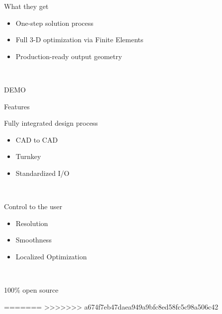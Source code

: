 \begin{frame}{What they get}	
\begin{itemize}
			\item One-step solution process	
			\item Full 3-D optimization via Finite Elements
			\item Production-ready output geometry
			\end{itemize}~\\
\end{frame}	

\begin{frame}{DEMO}

\end{frame}

\begin{frame}{Features}

\begin{block}{Fully integrated design process}{
		\begin{itemize}		
			\item CAD to CAD
			\item Turnkey
			\item Standardized I/O			
		\end{itemize}~\\
		}
		\end{block}
\pause
\begin{block}{Control to the user}{
		\begin{itemize}		
			\item Resolution
			\item Smoothness
			\item Localized Optimization			
		\end{itemize}~\\
		}
		\end{block}
\pause		
\begin{block}{100\% open source}{
		}
		\end{block}

\end{frame}
		
=======
>>>>>>> a674f7eb47daea949a9bfc8ed58fc5c98a506c42
